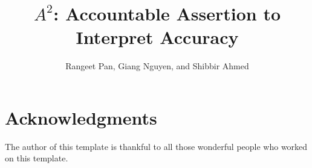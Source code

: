 \documentclass{llncs}
\begin{document}
\title{$A^2$: Accountable Assertion to Interpret Accuracy}
\author{Rangeet Pan, Giang Nguyen, and Shibbir Ahmed}

%



\maketitle

\begin{abstract}

\end{abstract}

 




 
%
%
%
\section{Acknowledgments}

The author of this template is thankful to all those 
wonderful people who worked on this template. 


  
\end{document}
